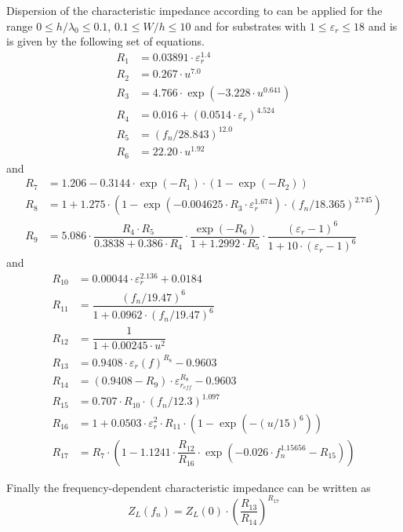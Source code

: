 Dispersion of the characteristic impedance according to
\cite{Kirschning1} can be applied for the range $0 \le h/\lambda_0 \le
0.1$, $0.1 \le W/h \le 10$ and for substrates with $1 \le
\varepsilon_r \le 18$ and is is given by the following set of
equations.
\begin{align}
R_1 &= 0.03891\cdot \varepsilon_r^{1.4}\\
R_2 &= 0.267\cdot u^{7.0}\\
R_3 &= 4.766\cdot \exp{ \left(-3.228\cdot u^{0.641}\right)}\\
R_4 &= 0.016 + \left(0.0514\cdot \varepsilon_r\right)^{4.524}\\
R_5 &= \left(f_n / 28.843\right)^{12.0}\\
R_6 &= 22.20\cdot u^{1.92}
\end{align}
and
\begin{align}
R_7 &= 1.206 - 0.3144\cdot \exp{\left(-R_1\right)}\cdot \left(1 - \exp{\left(-R_2\right)}\right)\\
R_8 &= 1 + 1.275\cdot \left(1 - \exp{ \left(-0.004625\cdot R_3\cdot \varepsilon_r^{1.674}\right)} \cdot \left(f_n / 18.365\right)^{2.745}\right)\\
R_9 &= 5.086\cdot \dfrac{R_4\cdot R_5}{0.3838 + 0.386\cdot R_4}\cdot \dfrac{\exp{\left(-R_6\right)}}{1 + 1.2992\cdot R_5}\cdot \dfrac{\left(\varepsilon_r - 1\right)^6}{1 + 10\cdot \left(\varepsilon_r - 1\right)^6}
\end{align}
and
\begin{align}
R_{10} &= 0.00044\cdot \varepsilon_r^{2.136} + 0.0184\\
R_{11} &= \dfrac{\left(f_n / 19.47\right)^6}{1 + 0.0962\cdot \left(f_n / 19.47\right)^6}\\
R_{12} &= \dfrac{1}{1 + 0.00245\cdot u^2}\\
R_{13} &= 0.9408\cdot \varepsilon_{r}(f)^{R_8} - 0.9603\\
R_{14} &= \left(0.9408 - R_9\right)\cdot \varepsilon_{r_{eff}}^{R_8} - 0.9603\\
R_{15} &= 0.707\cdot R_{10}\cdot \left(f_n / 12.3\right)^{1.097}\\
R_{16} &= 1 + 0.0503\cdot \varepsilon_r^2\cdot R_{11}\cdot \left(1 - \exp{ \left(- \left(u / 15\right)^6\right)}\right)\\
\label{eq:KirschningR17}
R_{17} &= R_7\cdot \left(1 - 1.1241\cdot \dfrac{R_{12}}{R_{16}}\cdot \exp{ \left(-0.026\cdot f_n^{1.15656} - R_{15}\right)}\right)
\end{align}

Finally the frequency-dependent characteristic impedance can be
written as
\begin{equation}
\label{eq:KirschningZLdisp}
Z_L(f_n) = Z_L(0)\cdot \left(\dfrac{R_{13}}{R_{14}}\right)^{R_{17}}
\end{equation}

